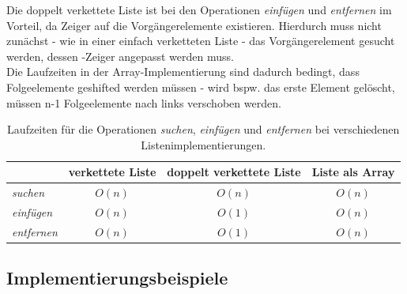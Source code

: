 \noindent
Die doppelt verkettete Liste ist bei den Operationen \textit{einfügen} und \textit{entfernen} im Vorteil, da Zeiger auf die Vorgängerelemente existieren.
Hierdurch muss nicht zunächst - wie in einer einfach verketteten Liste - das Vorgängerelement gesucht werden, dessen -Zeiger angepasst werden muss.\\
Die Laufzeiten in der Array-Implementierung sind dadurch bedingt, dass Folgeelemente geshifted werden müssen - wird bspw. das erste Element gelöscht, müssen n-1 Folgeelemente nach links verschoben werden.

\setlength{\tabcolsep}{1.5em}
\renewcommand{\arraystretch}{1.5}%
\begin{table} %
    \centering
    \begin{tabular}{|l | c | c | c|}
        \hline
                            & verkettete Liste & doppelt verkettete Liste & Liste als Array \\
        \hline
        \textit{suchen}     &    $O(n) $    &    $O(n)$      & $O(n)$ \\
        \hline
        \textit{einfügen}   &    $O(n) $    &    $O(1)$      & $O(n)$ \\
        \hline
        \textit{entfernen}  &    $O(n) $    &    $O(1)$     &  $O(n)$\\
        \hline
    \end{tabular}
    \caption{Laufzeiten für die Operationen \textit{suchen}, \textit{einfügen} und \textit{entfernen} bei verschiedenen Listenimplementierungen.}
    \label{tab:listruntime}
\end{table}


\subsection{Implementierungsbeispiele}

